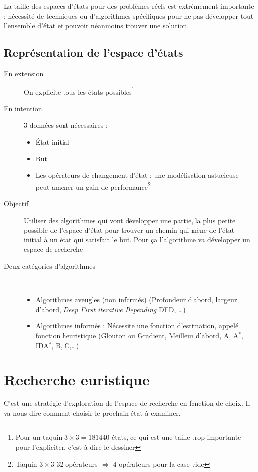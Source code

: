 \documentclass[12pt,a4paper,openany]{book}
\begin{document}
		\begin{remarque}
			La taille des espaces d'états pour des problèmes réels est extrêmement importante  : nécessité de techniques ou d'algorithmes
			spécifiques pour ne pas développer tout l'ensemble d'état et pouvoir néanmoins trouver une solution.
		\end{remarque}

		\subsection{Représentation de l'espace d'états}
		\begin{description}
			\item[En extension] On explicite tous les états possibles\footnote{Pour un taquin $3\times 3 = 181440$ états, ce qui est une taille trop
				importante pour l'expliciter, c'est-à-dire le dessiner}

			\item[En intention] 3 données sont nécessaires :
				\begin{itemize}
					\item État initial
					\item But
					\item Les opérateurs de changement d'état : une modélisation astucieuse peut amener un gain de performance\footnote{Taquin
						$3\times 3$ 32 opérateurs
						$\Leftrightarrow$ 4 opérateurs pour la case vide}
				\end{itemize}
			\item[Objectif] Utiliser des algorithmes qui vont développer une partie, la plus petite possible de l'espace d'état pour trouver un
				chemin qui mène de l'état initial à un état qui satisfait le but. Pour ça l'algorithme va développer un espace de recherche
			\item[Deux catégories d'algorithmes] ~
				\begin{itemize}
					\item Algorithmes aveugles (non informés) (Profondeur d'abord, largeur d'abord, \textit{Deep First iterative Depending} DFD,
						\ldots)
					\item Algorithmes informés : Nécessite une fonction d'estimation, appelé fonction heuristique (Glouton ou Gradient, Meilleur
						d'abord, A, A$^*$, IDA$^*$, B, C,\ldots)
				\end{itemize}
		\end{description}
		\section{Recherche euristique}
		C'est une stratégie d'exploration de l'espace de recherche en fonction de choix. Il va nous dire comment choisir le prochain état à examiner.
\end{document}
